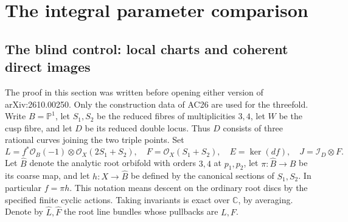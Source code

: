 \section{The integral parameter comparison}

\subsection{The blind control: local charts and coherent direct images}

The proof in this section was written before opening either version of
arXiv:2610.00250.  Only the construction data of AC26 are used for the
threefold.  Write $B=\mathbb P^1$, let $S_1,S_2$ be the reduced fibres of
multiplicities $3,4$, let $W$ be the cusp fibre, and let $D$ be its reduced
double locus.  Thus $D$ consists of three rational curves joining the two
triple points.  Set
\[
 L=f^*\mathcal O_B(-1)\otimes\mathcal O_X(2S_1+S_2),\quad
 F=\mathcal O_X(S_1+S_2),\quad
 E=\ker(df),\quad J=\mathcal I_D\otimes F.
\]
Let $\widehat B$ denote the analytic root orbifold with orders $3,4$ at
$p_1,p_2$, let $\pi:\widehat B\to B$ be its coarse map, and let
$h:X\to\widehat B$ be defined by the canonical sections of $S_1,S_2$.
In particular $f=\pi h$.  This notation means descent on the ordinary
root discs by the specified finite cyclic actions.  Taking invariants is
exact over $\mathbb C$, by averaging.  Denote by $\widehat L,\widehat F$
the root line bundles whose pullbacks are $L,F$.

